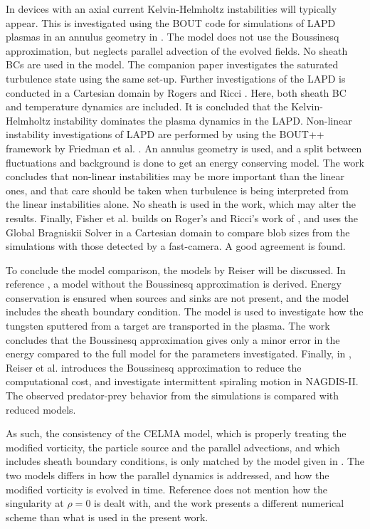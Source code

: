 In devices with an axial current Kelvin-Helmholtz instabilities will typically appear.
This is investigated using the BOUT code for simulations of LAPD plasmas in an annulus geometry in \cite{Popovich2010a}.
The model does not use the Boussinesq approximation, but neglects parallel advection of the evolved fields.
No sheath BCs are used in the model.
The companion paper \cite{Popovich2010} investigates the saturated turbulence state using the same set-up.
Further investigations of the LAPD is conducted in a Cartesian domain by Rogers and Ricci \cite{Rogers2010}.
Here, both sheath BC and temperature dynamics are included.
It is concluded that the Kelvin-Helmholtz instability dominates the plasma dynamics in the LAPD.
Non-linear instability investigations of LAPD are performed by using the BOUT++ framework by Friedman et al. \cite{Friedman2012}.
An annulus geometry is used, and a split between fluctuations and background is done to get an energy conserving model.
The work concludes that non-linear instabilities may be more important than the linear ones, and that care should be taken when turbulence is being interpreted from the linear instabilities alone.
No sheath is used in the work, which may alter the results.
Finally, Fisher et al. \cite{Fisher2015} builds on Roger's and Ricci's work of \cite{Rogers2010}, and uses the Global Bragniskii Solver in a Cartesian domain to compare blob sizes from the simulations with those detected by a fast-camera.
A good agreement is found.

To conclude the model comparison, the models by Reiser will be discussed.
In reference \cite{Reiser2012}, a model without the Boussinesq approximation is derived.
Energy conservation is ensured when sources and sinks are not present, and the model includes the sheath boundary condition.
The model is used to investigate how the tungsten sputtered from a target are transported in the plasma.
The work concludes that the Boussinesq approximation gives only a minor error in the energy compared to the full model for the parameters investigated.
Finally, in \cite{Reiser2014}, Reiser et al. introduces the Boussinesq approximation to reduce the computational cost, and investigate intermittent spiraling motion in NAGDIS-II.
The observed predator-prey behavior from the simulations is compared with reduced models.

As such, the consistency of the CELMA model, which is properly treating the modified vorticity, the particle source and the parallel advections, and which includes sheath boundary conditions, is only matched by the model given in \cite{Reiser2012}.
The two models differs in how the parallel dynamics is addressed, and how the modified vorticity is evolved in time.
Reference \cite{Reiser2012} does not mention how the singularity at $\rho=0$ is dealt with, and the work presents a different numerical scheme than what is used in the present work.
